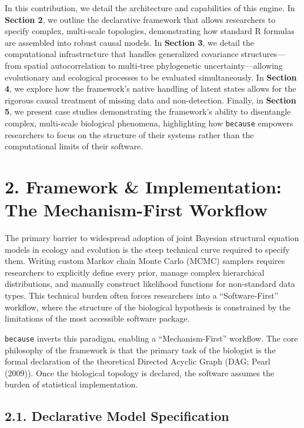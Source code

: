 \documentclass[
]{article}
\begin{document}
In this contribution, we detail the architecture and capabilities of this engine. In \textbf{Section 2}, we outline the declarative framework that allows researchers to specify complex, multi-scale topologies, demonstrating how standard R formulas are assembled into robust causal models. In \textbf{Section 3}, we detail the computational infrastructure that handles generalized covariance structures---from spatial autocorrelation to multi-tree phylogenetic uncertainty---allowing evolutionary and ecological processes to be evaluated simultaneously. In \textbf{Section 4}, we explore how the framework's native handling of latent states allows for the rigorous causal treatment of missing data and non-detection. Finally, in \textbf{Section 5}, we present case studies demonstrating the framework's ability to disentangle complex, multi-scale biological phenomena, highlighting how \texttt{because} empowers researchers to focus on the structure of their systems rather than the computational limits of their software.

\section{2. Framework \& Implementation: The Mechanism-First Workflow}\label{framework-implementation-the-mechanism-first-workflow}

The primary barrier to widespread adoption of joint Bayesian structural equation models in ecology and evolution is the steep technical curve required to specify them. Writing custom Markov chain Monte Carlo (MCMC) samplers requires researchers to explicitly define every prior, manage complex hierarchical distributions, and manually construct likelihood functions for non-standard data types. This technical burden often forces researchers into a ``Software-First'' workflow, where the structure of the biological hypothesis is constrained by the limitations of the most accessible software package.

\texttt{because} inverts this paradigm, enabling a ``Mechanism-First'' workflow. The core philosophy of the framework is that the primary task of the biologist is the formal declaration of the theoretical Directed Acyclic Graph (DAG; Pearl (2009)). Once the biological topology is declared, the software assumes the burden of statistical implementation.

\subsection{2.1. Declarative Model Specification}\label{declarative-model-specification}
\end{document}
